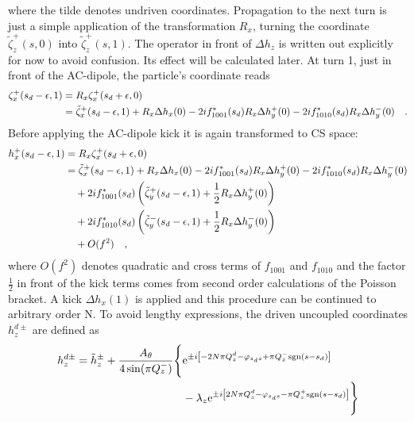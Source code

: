 %
where the tilde denotes undriven coordinates.
Propagation to the next turn is just a simple application of the transformation $R_x$, turning the
coordinate $\tilde{\zeta}_z^+(s,0)$ into $\tilde{\zeta}_z^+(s,1)$. The operator in front of $\Delta h_z$
is written out explicitly for now to avoid confusion. Its effect will be calculated later.
At turn 1, just in front of the AC-dipole, the particle's coordinate reads
%
\begin{align}
    \zeta_x^+(s_d-\epsilon, 1) &= R_x\zeta_x^+(s_d+\epsilon, 0) \notag \\
        &= \tilde{\zeta}_x^+(s_d-\epsilon, 1) + R_x\Delta h_x(0)
            - 2if_{1001}^*(s_d) R_x\Delta h_y^+(0)
            - 2if_{1010}^*(s_d) R_x\Delta h_y^-(0)
            \quad .
\end{align}
%
Before applying the AC-dipole kick it is again transformed to CS space:
%
\begin{align}
    h_x^+(s_d-\epsilon, 1) &=R_x\zeta_x^+(s_d+\epsilon, 0) \notag \\
        &=
        \tilde{\zeta}_x^+(s_d-\epsilon, 1) + R_x\Delta h_x(0)
            - 2if_{1001}^*(s_d) R_x\Delta h_y^+(0)
            - 2if_{1010}^*(s_d) R_x\Delta h_y^-(0)
        \notag \\ &\quad 
            + 2if_{1001}^*(s_d) \left(\tilde{\zeta}_y^+(s_d-\epsilon, 1) + \frac{1}{2}R_x\Delta h_y^+(0) \right)
        \notag \\ &\quad 
            + 2if_{1010}^*(s_d) \left(\tilde{\zeta}_y^-(s_d-\epsilon, 1) + \frac{1}{2}R_x\Delta h_y^-(0) \right)
        \notag \\ &\quad
            + O(f^2)
        \quad ,
    \label{eq_cpl_drv_n1}
\end{align}
%
where $O(f^2)$ denotes quadratic and cross terms of $f_{1001}$ and $f_{1010}$ and the factor $\frac{1}{2}$
in front of the kick terms comes from second order calculations of the Poisson bracket. 
A kick $\Delta h_x(1)$ is applied and this procedure can be continued to arbitrary order N.
To avoid lengthy expressions, the driven uncoupled coordinates $h_z^{d\pm}$ are defined as
%
\begin{align}
    h_z^{d\pm} = \tilde{h}_z^{\pm} 
    +\frac{A_\theta}{4\sin(\pi Q_z^-)} \Bigg\{&
    \text{e}^{\pm i\left[-2N\pi Q_z^d - \varphi_{s_ds} + \pi Q_z^-\text{sgn}(s-s_d)\right]}
    \notag\\
    &- \lambda_z\text{e}^{\pm i\left[2N\pi Q_z^d - \varphi_{s_ds} - \pi Q_z^+\text{sgn}(s-s_d)\right]}
    \Bigg\}
\end{align}
